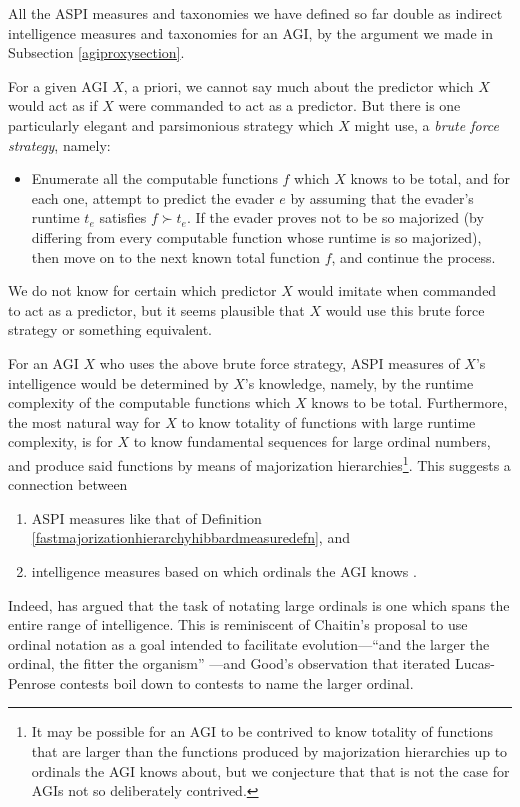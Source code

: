 \documentclass[twoside,11pt]{article}
\begin{document}
All the ASPI measures and taxonomies we have defined so far double as indirect
intelligence measures and taxonomies for an AGI, by the argument we made
in Subsection \ref{agiproxysection}.

For a given AGI $X$, a priori, we cannot say much about the predictor which $X$
would act as if $X$ were commanded to act as a predictor. But there is one particularly
elegant and parsimonious strategy which $X$ might use, a \emph{brute force strategy},
namely:
\begin{itemize}
    \item Enumerate all the
    computable functions $f$ which $X$ knows to be total, and for each one, attempt to
    predict the evader $e$ by assuming that the evader's runtime $t_e$
    satisfies $f\succ t_e$.
    If the evader proves not to be so majorized (by differing from every computable
    function whose runtime is so majorized), then move on to the next
    known total function $f$, and continue the process.
\end{itemize}
We do not
know for certain which predictor $X$ would imitate when commanded to act as a predictor,
but it seems plausible that $X$ would use this brute force strategy or something
equivalent.

For an AGI $X$ who uses the above brute force strategy, ASPI
measures of $X$'s intelligence would be determined by $X$'s knowledge, namely,
by the runtime complexity of the computable functions which $X$ knows to be total.
Furthermore, the most natural way for $X$ to know totality of functions with large
runtime complexity, is for $X$ to know fundamental sequences for large ordinal
numbers, and produce said functions by means of majorization
hierarchies\footnote{It may be
possible for an AGI to be contrived to know totality of functions that are larger
than the functions produced by majorization hierarchies up to ordinals the AGI knows
about, but we conjecture that that is not the case for AGIs not so deliberately
contrived.}. This suggests a connection between
\begin{enumerate}
    \item
    ASPI measures like that of
    Definition \ref{fastmajorizationhierarchyhibbardmeasuredefn}, and
    \item
    intelligence measures based on which ordinals the AGI knows
    \citep{ioi1}.
\end{enumerate}
Indeed, \citet{ioi2} has argued that
the task of notating large ordinals is one which
spans the entire range of intelligence.
This is reminiscent of Chaitin's proposal to use ordinal notation
as a goal intended to facilitate evolution---``and the larger the ordinal,
the fitter the organism'' \citep{chaitin}---and Good's observation
\citep{good1969godel} that iterated Lucas-Penrose contests boil down to
contests to name the larger ordinal.
\end{document}
